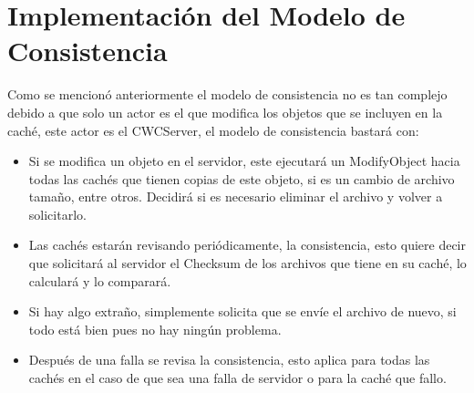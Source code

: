 \section{Implementación del Modelo de Consistencia}
Como se mencionó anteriormente el modelo de consistencia no es tan complejo debido a que solo un actor es el que modifica los objetos que se incluyen en la caché, este actor es el CWCServer, el modelo de consistencia bastará con:

\begin{itemize}
\item Si se modifica un objeto en el servidor, este ejecutará un ModifyObject hacia todas las cachés que tienen copias de este objeto, si es un cambio de archivo tamaño, entre otros. Decidirá si es necesario eliminar el archivo y volver a solicitarlo.
\item Las cachés estarán revisando periódicamente, la consistencia, esto quiere decir que solicitará al servidor el Checksum de los archivos que tiene en su caché, lo calculará y lo comparará.
\item Si hay algo extraño, simplemente solicita que se envíe el archivo de nuevo, si todo está bien pues no hay ningún problema.
\item Después de una falla se revisa la consistencia, esto aplica para todas las cachés en el caso de que sea una falla de servidor o para la caché que fallo.
\end{itemize}